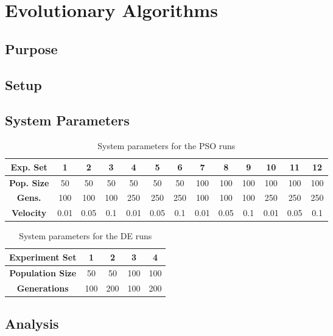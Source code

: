 \section{Evolutionary Algorithms}

\subsection{Purpose}



\subsection{Setup}



\subsection{System Parameters}

\begin{table}
	\label{table:ea-pso}
	\centering
	\begin{tabular}{ | >{\bfseries}c | c | c | c | c | c | c | c | c | c | c | c | c | }
		\hline
		Exp. Set & 1 & 2 & 3 & 4 & 5 & 6 & 7 & 8 & 9 & 10 & 11 & 12 \\ \hline
		Pop. Size & 50 & 50 & 50 & 50 & 50 & 50 & 100 & 100 & 100 & 100 & 100 & 100 \\ \hline
		Gens. & 100 & 100 & 100 & 250 & 250 & 250 & 100 & 100 & 100 & 250 & 250 & 250 \\ \hline
		Velocity & 0.01 & 0.05 & 0.1 & 0.01 & 0.05 & 0.1 & 0.01 & 0.05 & 0.1 & 0.01 & 0.05 & 0.1 \\ \hline
	\end{tabular}
	\caption{System parameters for the PSO runs}
\end{table}

\begin{table}
	\label{table:ea-de}
	\centering
	\begin{tabular}{ | >{\bfseries}c | c | c | c | c | }
		\hline
		Experiment Set & 1 & 2 & 3 & 4 \\ \hline
		Population Size & 50 & 50 & 100 & 100 \\ \hline
		Generations & 100 & 200 & 100 & 200 \\ \hline
	\end{tabular}
	\caption{System parameters for the DE runs}
\end{table}

\subsection{Analysis}

